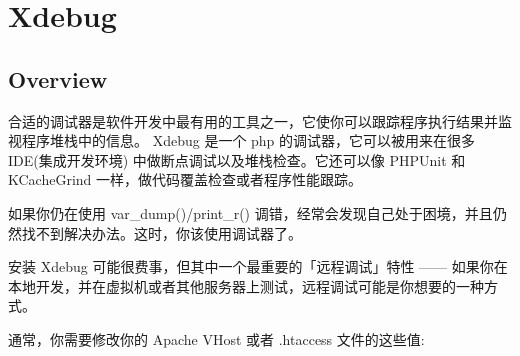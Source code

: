 \part{Xdebug}


\chapter{Overview}

合适的调试器是软件开发中最有用的工具之一，它使你可以跟踪程序执行结果并监视程序堆栈中的信息。 Xdebug 是一个 php 的调试器，它可以被用来在很多 IDE(集成开发环境) 中做断点调试以及堆栈检查。它还可以像 PHPUnit 和 KCacheGrind 一样，做代码覆盖检查或者程序性能跟踪。

如果你仍在使用 var\_dump()/print\_r() 调错，经常会发现自己处于困境，并且仍然找不到解决办法。这时，你该使用调试器了。

安装 Xdebug 可能很费事，但其中一个最重要的「远程调试」特性 —— 如果你在本地开发，并在虚拟机或者其他服务器上测试，远程调试可能是你想要的一种方式。

通常，你需要修改你的 Apache VHost 或者 .htaccess 文件的这些值:

\begin{lstlisting}[language=bash]

\end{lstlisting}